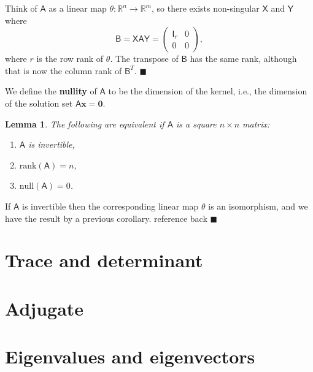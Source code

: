 \documentclass[letter-paper]{tufte-book}
\newtheorem{lemma}[theorem]{\color{pastel-blue}Lemma}
\newenvironment{proof}[1][Proof]{\begin{trivlist}
\item[\hskip \labelsep {\bfseries #1}]}{\end{trivlist}}
\newcommand{\As}{{\mathsf{A}}}
\newcommand{\Bs}{{\mathsf{B}}}
\newcommand{\Is}{{\mathsf{I}}}
\newcommand{\Xs}{{\mathsf{X}}}
\newcommand{\Ys}{{\mathsf{Y}}}
\newcommand{\Ob}{{\boldsymbol{0}}}
\newcommand{\xb}{{\boldsymbol{x}}}
\newcommand{\qed}{\hfill$\blacksquare$}
\begin{document}
\begin{proof}
  Think of $\As$ as a linear map $\theta: \mathbb{R}^n \to \mathbb{R}^m$, so
  there exists non-singular $\Xs$ and $\Ys$ where
  \begin{equation*}
    \Bs = \Xs \As \Ys = \begin{pmatrix}\Is_r & 0 \\ 0 & 0 \end{pmatrix},
  \end{equation*}
  where $r$ is the row rank of $\theta$. The transpose of $\Bs$ has the same
  rank, although that is now the column rank of $\Bs^T$. \qed
\end{proof}

We define the \textbf{nullity} of $\As$ to be the dimension of the kernel, i.e.,
the dimension of the solution set $\As\xb = \Ob$.

\begin{lemma}
  The following are equivalent if $\As$ is a square $n\times n$ matrix:
  \begin{enumerate}
    \item $\As$ is invertible,
    \item $\mbox{rank}(\As) = n$,
    \item $\mbox{null}(\As) = 0$.
  \end{enumerate}
\end{lemma}

\begin{proof}
  If $\As$ is invertible then the corresponding linear map $\theta$ is an
  isomorphism, and we have the result by a previous corollary.
  {\color{red}reference back} \qed
\end{proof}


\section{Trace and determinant}


\section{Adjugate}


\section{Eigenvalues and eigenvectors}
\end{document}
